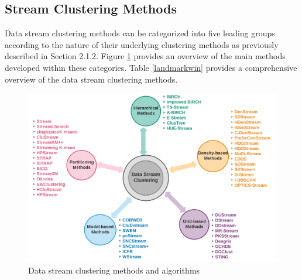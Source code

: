 \hspace{1 cm}

\subsection{Stream Clustering Methods}

Data stream clustering methods can be categorized into five leading groups according to the nature of their underlying clustering methods as previously described in Section 2.1.2. Figure \ref{method} provides an overview of the main methods developed within these categories. Table \ref{landmarkwin} provides a comprehensive overview of the data stream clustering methods. 


\begin{figure}[t]
\centering
\includegraphics[width = 12 cm]{image/Chapters/Chapter2/streammethod.png}
\caption{Data stream clustering methods and algorithms}
\label{method}
\end{figure}







